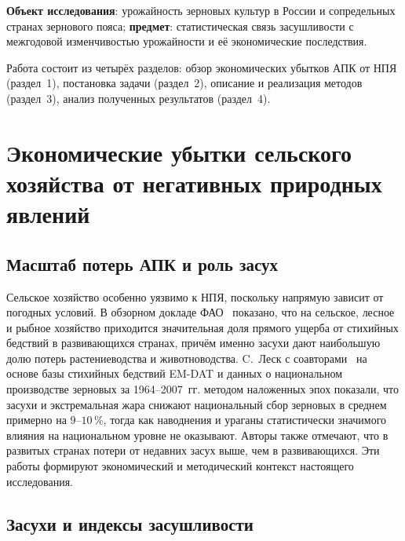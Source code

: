 \documentclass[14pt,a4paper]{extarticle}
\begin{document}
\textbf{Объект исследования}: урожайность зерновых культур в России и сопредельных странах зернового пояса; \textbf{предмет}: статистическая связь засушливости с межгодовой изменчивостью урожайности и её экономические последствия.

Работа состоит из четырёх разделов: обзор экономических убытков АПК от НПЯ (раздел~1), постановка задачи (раздел~2), описание и реализация методов (раздел~3), анализ полученных результатов (раздел~4).

\section{Экономические убытки сельского хозяйства от негативных природных явлений}

\subsection{Масштаб потерь АПК и роль засух}

Сельское хозяйство особенно уязвимо к НПЯ, поскольку напрямую зависит от погодных условий. В обзорном докладе ФАО~\cite{fao2021} показано, что на сельское, лесное и рыбное хозяйство приходится значительная доля прямого ущерба от стихийных бедствий в развивающихся странах, причём именно засухи дают наибольшую долю потерь растениеводства и животноводства. C.~Леск с соавторами~\cite{lesk2016} на основе базы стихийных бедствий EM-DAT и данных о национальном производстве зерновых за 1964--2007~гг. методом наложенных эпох показали, что засухи и экстремальная жара снижают национальный сбор зерновых в среднем примерно на $9$--$10\,\%$, тогда как наводнения и ураганы статистически значимого влияния на национальном уровне не оказывают. Авторы также отмечают, что в развитых странах потери от недавних засух выше, чем в развивающихся. Эти работы формируют экономический и методический контекст настоящего исследования.

\subsection{Засухи и индексы засушливости}
\end{document}
